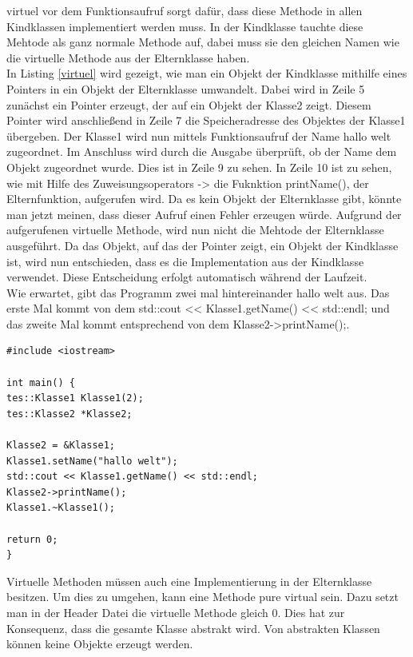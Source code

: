 \glqq virtuel\grqq{} vor dem Funktionsaufruf sorgt dafür, dass diese Methode in allen Kindklassen implementiert werden muss. In der Kindklasse tauchte diese Mehtode als ganz normale Methode auf, dabei muss sie den gleichen Namen wie die virtuelle Methode aus der Elternklasse haben.\\
In Listing \ref{virtuel} wird gezeigt, wie man ein Objekt der Kindklasse mithilfe eines Pointers in ein Objekt der Elternklasse umwandelt. Dabei wird in Zeile 5  zunächst ein Pointer erzeugt, der auf ein Objekt der Klasse2 zeigt. Diesem Pointer wird anschließend in Zeile 7 die Speicheradresse des Objektes der Klasse1 übergeben. Der Klasse1 wird nun mittels Funktionsaufruf der Name  \glqq hallo welt\grqq{} zugeordnet. Im Anschluss wird durch die Ausgabe überprüft, ob der Name dem Objekt zugeordnet wurde. Dies ist in Zeile 9 zu sehen. In Zeile 10 ist zu sehen, wie mit Hilfe des Zuweisungsoperators \glqq ->\grqq{} die Fuknktion \glqq printName()\grqq{}, der Elternfunktion, aufgerufen wird. Da es kein Objekt der Elternklasse gibt, könnte man jetzt meinen, dass dieser Aufruf einen Fehler erzeugen würde. Aufgrund der aufgerufenen virtuelle Methode, wird nun nicht die Mehtode der Elternklasse ausgeführt. Da das Objekt, auf das der Pointer zeigt, ein Objekt der Kindklasse ist, wird nun entschieden, dass es die Implementation aus der Kindklasse verwendet. Diese Entscheidung erfolgt automatisch während der Laufzeit. \\
Wie erwartet, gibt das Programm zwei mal hintereinander \glqq hallo welt\grqq{} aus. Das erste Mal kommt von dem \glqq std::cout << Klasse1.getName() << std::endl;\grqq{} und das zweite Mal kommt entsprechend von dem \glqq Klasse2->printName();\grqq{}.
\begin{lstlisting}[caption = Beispiel virtuelle Funktion,label=virtuel]
#include <iostream>

int main() {
tes::Klasse1 Klasse1(2);
tes::Klasse2 *Klasse2;

Klasse2 = &Klasse1;
Klasse1.setName("hallo welt");
std::cout << Klasse1.getName() << std::endl;
Klasse2->printName();
Klasse1.~Klasse1();

return 0;
}
\end{lstlisting}
Virtuelle Methoden müssen  auch eine Implementierung in der Elternklasse besitzen. Um dies zu umgehen, kann eine Methode \glqq pure virtual\grqq{} sein. Dazu setzt man in der Header Datei die virtuelle Methode gleich 0. Dies hat zur Konsequenz, dass die gesamte Klasse abstrakt wird. Von abstrakten Klassen können keine Objekte erzeugt werden. 
